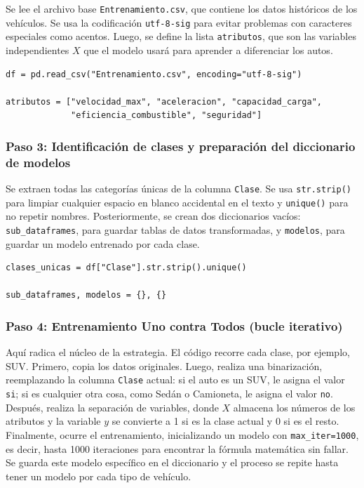 \documentclass[]{article}
\begin{document}
Se lee el archivo base \texttt{Entrenamiento.csv}, que contiene los datos históricos de los vehículos. Se usa la codificación \texttt{utf-8-sig} para evitar problemas con caracteres especiales como acentos. Luego, se define la lista \texttt{atributos}, que son las variables independientes $X$ que el modelo usará para aprender a diferenciar los autos.

\begin{lstlisting}
df = pd.read_csv("Entrenamiento.csv", encoding="utf-8-sig")

atributos = ["velocidad_max", "aceleracion", "capacidad_carga",
             "eficiencia_combustible", "seguridad"]
\end{lstlisting}

\subsubsection*{Paso 3: Identificación de clases y preparación del diccionario de modelos}

Se extraen todas las categorías únicas de la columna \texttt{Clase}. Se usa \texttt{str.strip()} para limpiar cualquier espacio en blanco accidental en el texto y \texttt{unique()} para no repetir nombres. Posteriormente, se crean dos diccionarios vacíos: \texttt{sub\_dataframes}, para guardar tablas de datos transformadas, y \texttt{modelos}, para guardar un modelo entrenado por cada clase.

\begin{lstlisting}
clases_unicas = df["Clase"].str.strip().unique()

sub_dataframes, modelos = {}, {}
\end{lstlisting}

\subsubsection*{Paso 4: Entrenamiento Uno contra Todos (bucle iterativo)}

Aquí radica el núcleo de la estrategia. El código recorre cada clase, por ejemplo, SUV. Primero, copia los datos originales. Luego, realiza una binarización, reemplazando la columna \texttt{Clase} actual: si el auto es un SUV, le asigna el valor \texttt{si}; si es cualquier otra cosa, como Sedán o Camioneta, le asigna el valor \texttt{no}. Después, realiza la separación de variables, donde $X$ almacena los números de los atributos y la variable $y$ se convierte a 1 si es la clase actual y 0 si es el resto. Finalmente, ocurre el entrenamiento, inicializando un modelo con \texttt{max\_iter=1000}, es decir, hasta 1000 iteraciones para encontrar la fórmula matemática sin fallar. Se guarda este modelo específico en el diccionario y el proceso se repite hasta tener un modelo por cada tipo de vehículo.
\end{document}
